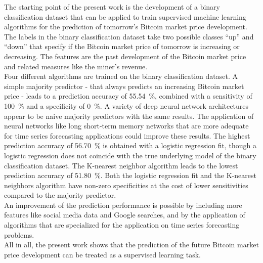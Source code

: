 The starting point of the present work is the development of a binary classification dataset that can be applied to train supervised machine learning algorithms for the prediction of tomorrow's Bitcoin market price development. The labels in the binary classification dataset take two possible classes \enquote{up} and \enquote{down} that specify if the Bitcoin market price of tomorrow is increasing or decreasing. The features are the past development of the Bitcoin market price and related measures like the miner's revenue.\\

Four different algorithms are trained on the binary classification dataset. A simple majority predictor - that always predicts an increasing Bitcoin market price - leads to a prediction accuracy of \SI{55.54}{\percent}, combined with a sensitivity of \SI{100}{\percent} and a specificity of \SI{0}{\percent}. A variety of deep neural network architectures appear to be naive majority predictors with the same results. The application of neural networks like long short-term memory networks that are more adequate for time series forecasting applications could improve these results. The highest prediction accuracy of \SI{56.70}{\percent} is obtained with a logistic regression fit, though a logistic regression does not coincide with the true underlying model of the binary classification dataset. The K-nearest neighbor algorithm leads to the lowest prediction accuracy of \SI{51.80}{\percent}. Both the logistic regression fit and the K-nearest neighbors algorithm have non-zero specificities at the cost of lower sensitivities compared to the majority predictor.\\

An improvement of the prediction performance is possible by including more features like social media data and Google searches, and by the application of algorithms that are specialized for the application on time series forecasting problems.\\

All in all, the present work shows that the prediction of the future Bitcoin market price development can be treated as a supervised learning task.